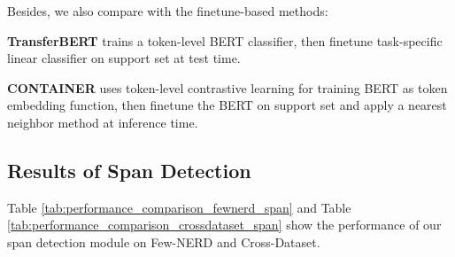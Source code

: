 \documentclass[11pt]{article}
\begin{document}
Besides, we also compare with the finetune-based methods:

\textbf{TransferBERT} \citep{hou2020few} trains a token-level BERT classifier, then finetune task-specific linear classifier on support set at test time.

\textbf{CONTAINER} \citep{das2021container} uses token-level contrastive learning for training BERT as token embedding function, then finetune the BERT on support set and apply a nearest neighbor method at inference time.


\subsection{Results of Span Detection}
Table \ref{tab:performance_comparison_fewnerd_span} and Table \ref{tab:performance_comparison_crossdataset_span} show the performance of our span detection module on Few-NERD and Cross-Dataset.

\label{sec:results_span}
\begin{table}[t]
    \centering
    \setlength{\tabcolsep}{1mm}
    \caption{F1 scores of our entity span detection module on \textbf{Few-NERD} for both inter and intra settings.}
    \label{tab:performance_comparison_fewnerd_span}
\end{table}

\begin{table}[t]
    \centering
    \setlength{\tabcolsep}{1mm}
    \caption{F1 scores of our entity span detection module on \textbf{Cross-Dataset}.}
    \label{tab:performance_comparison_crossdataset_span}
\end{table}
\end{document}
